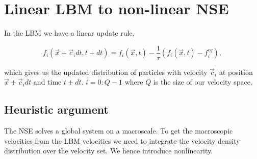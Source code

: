 

\section{Linear LBM to non-linear NSE}

In the LBM we have a linear update rule,

\begin{equation}
    f_i(\vec{x} + \vec{c}_{i}dt, t + dt) = f_i(\vec{x},t) - \frac{1}{\tau} ( f_i(\vec{x},t) - f_{i}^{eq}),
\end{equation}

which gives us the updated distribution of particles with velocity $\vec{c}_i$ 
at position $\vec{x} + \vec{c}_idt$ and time $t+dt$. $i = 0:Q-1$ where $Q$ is 
the size of our velocity space.\\

\subsection{Heuristic argument}

The NSE solves a global system on a macroscale. To get the macroscopic 
velocities from the LBM velocities we need to integrate the velocity 
density distribution over the velocity set. We hence introduce nonlinearity.\\


